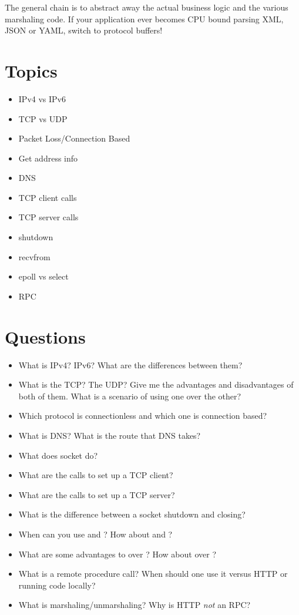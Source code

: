 The general chain is to abstract away the actual business logic and the various marshaling code.
If your application ever becomes CPU bound parsing XML, JSON or YAML, switch to protocol buffers!

\section{Topics}

\begin{itemize}
\item
  IPv4 vs IPv6
\item
  TCP vs UDP
\item
  Packet Loss/Connection Based
\item
  Get address info
\item
  DNS
\item
  TCP client calls
\item
  TCP server calls
\item
  shutdown
\item
  recvfrom
\item
  epoll vs select
\item
  RPC
\end{itemize}

\section{Questions}

\begin{itemize}
\item
  What is IPv4? IPv6? What are the differences between them?
\item
  What is the TCP? The UDP? Give me the advantages and disadvantages of both of them.
  What is a scenario of using one over the other?
\item
  Which protocol is connectionless and which one is connection based?
\item
  What is DNS? What is the route that DNS takes?
\item
  What does socket do?
\item
  What are the calls to set up a TCP client?
\item
  What are the calls to set up a TCP server?
\item
  What is the difference between a socket shutdown and closing?
\item
  When can you use  and ? How about  and ?
\item
  What are some advantages to  over ? How about  over ?
\item
  What is a remote procedure call? When should one use it versus HTTP or running code locally?
\item
  What is marshaling/unmarshaling? Why is HTTP \emph{not} an RPC?
\end{itemize}



